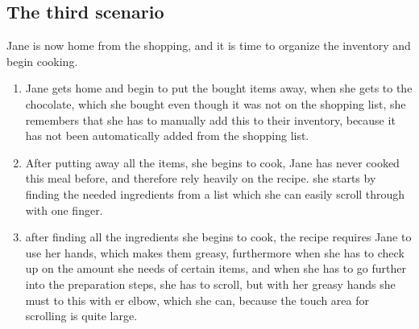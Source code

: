 \subsection{The third scenario}
Jane is now home from the shopping, and it is time to organize the inventory and begin cooking.
\begin{enumerate}
  \item Jane gets home and begin to put the bought items away, when she gets to the chocolate, which she bought even though it was not on the shopping list, she remembers that she has to manually add this to their inventory, because it has not been automatically added from the shopping list.
  \item After putting away all the items, she begins to cook, Jane has never cooked this meal before, and therefore rely heavily on the recipe. she starts by finding the needed ingredients from a list which she can easily scroll through with one finger.
  \item after finding all the ingredients she begins to cook, the recipe requires Jane to use her hands, which makes them greasy, furthermore when she has to check up on the amount she needs of certain items, and when she has to go further into the preparation steps, she has to scroll, but with her greasy hands she must to this with er elbow, which she can, because the touch area for scrolling is quite large. 
\end{enumerate}